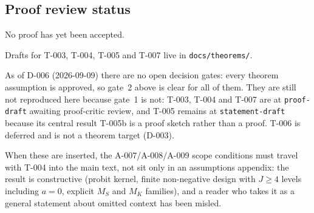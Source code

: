 %

\subsection{Proof review status}

No proof has yet been accepted.

Drafts for T-003, T-004, T-005 and T-007 live in \texttt{docs/theorems/}.

As of D-006 (2026-09-09) there are no open decision gates: every theorem
assumption is approved, so gate~2 above is clear for all of them. They are still
not reproduced here because gate~1 is not: T-003, T-004 and T-007 are at
\texttt{proof-draft} awaiting proof-critic review, and T-005 remains at
\texttt{statement-draft} because its central result T-005b is a proof sketch
rather than a proof. T-006 is deferred and is not a theorem target (D-003).

When these are inserted, the A-007/A-008/A-009 scope conditions must travel with
T-004 into the main text, not sit only in an assumptions appendix: the result is
constructive (probit kernel, finite non-negative design with $J \ge 4$ levels
including $a=0$, explicit $M_S$ and $M_K$ families), and a reader who takes it as
a general statement about omitted context has been misled.
